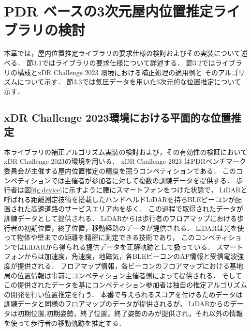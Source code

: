 
\chapter{PDR ベースの3次元屋内位置推定ライブラリの検討}
\thispagestyle{myheadings}
本章では，屋内位置推定ライブラリの要求仕様の検討およびその実装について述べる．
節3.1ではライブラリの要求仕様について詳述する．
節3.2ではライブラリの構成とxDR Challenge 2023 環境における補正処理の適用例と
そのアルゴリズムについて示す．
節3.3では気圧データを用いた3次元的な位置推定について示す．




\section{xDR Challenge 2023環境における平面的な位置推定}

本ライブラリの補正アルゴリズム実装の検討および，その有効性の検証においてxDR Challenge 2023\cite{xdr}の環境を用いる．
xDR Challenge 2023 はPDRベンチマーク委員会が主催する屋内位置推定の精度を競うコンペティションである．
このコンペティションでは主催者が参加者に対して複数の訓練データを提供する．
歩行者は図\ref{fig:device}に示すように腰にスマートフォンをつけた状態で，
LiDARと呼ばれる距離測定技術を搭載したハンドヘルドLiDARを持ちBLEビーコンが配置された高速道路のサービスエリア内を歩く．
この過程で取得されたデータが訓練データとして提供される．
LiDARからは歩行者のフロアマップにおける歩行者の初期位置，終了位置，移動経路のデータが提供される．
LiDARは光を使って物体や壁までの距離を精密に測定できる技術であり，
このコンペティションではLiDARから得られる提供データを正解軌跡として扱っている．
スマートフォンからは加速度，角速度，地磁気，各BLEビーコンのAP情報と受信電波強度が提供される．
フロアマップ情報，各ビーコンのフロアマップにおける基地局の位置情報は事前にコンペティション主催者側によって提供される．
そしてこの提供されたデータを基にコンペティション参加者は独自の推定アルゴリズムの開発を行い位置推定を行う．
本番で与えられるスコアを付けるためデータは訓練データと同様のフロアマップのデータが提供されるが，
LiDARからのデータは初期位置,初期姿勢，終了位置，終了姿勢のみが提供され，それ以外の情報を使って歩行者の移動軌跡を推定する．


